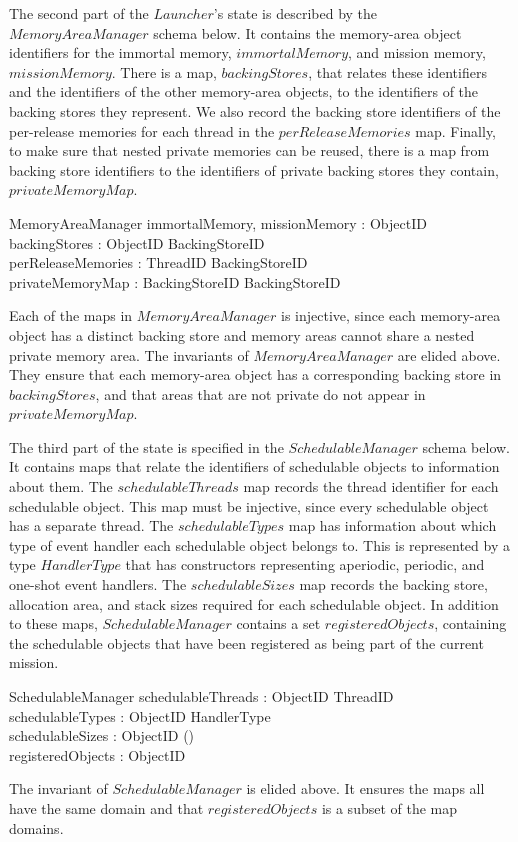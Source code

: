 The second part of the $Launcher$'s state is described by the
$MemoryAreaManager$ schema below.
It contains the memory-area object identifiers for the immortal
memory, $immortalMemory$, and mission memory, $missionMemory$.
There is a map, $backingStores$, that relates these identifiers and
the identifiers of the other memory-area objects, to the identifiers
of the backing stores they represent.
We also record the backing store identifiers of the per-release
memories for each thread in the $perReleaseMemories$ map.
Finally, to make sure that nested private memories can be reused,
there is a map from backing store identifiers to the identifiers of
private backing stores they contain, $privateMemoryMap$.
\begin{schema}{MemoryAreaManager}
  immortalMemory, missionMemory : ObjectID \\
  backingStores : ObjectID \finj BackingStoreID \\
  perReleaseMemories : ThreadID \finj BackingStoreID \\
  privateMemoryMap : BackingStoreID \finj BackingStoreID
\where
  \cdots
\end{schema}
Each of the maps in $MemoryAreaManager$ is injective, since each
memory-area object has a distinct backing store and memory areas
cannot share a nested private memory area.
The invariants of $MemoryAreaManager$ are elided above. 
They ensure that each memory-area object has a corresponding backing
store in $backingStores$, and that areas that are not private do not
appear in $privateMemoryMap$.

The third part of the state is specified in the $SchedulableManager$
schema below.
It contains maps that relate the identifiers of schedulable objects to
information about them.
The $schedulableThreads$ map records the thread identifier for each
schedulable object.
This map must be injective, since every schedulable object has a
separate thread.
The $schedulableTypes$ map has information about which type of
event handler each schedulable object belongs to.
This is represented by a type $HandlerType$ that has constructors
representing aperiodic, periodic, and one-shot event handlers.
The $schedulableSizes$ map records the backing store, allocation area,
and stack sizes required for each schedulable object.
In addition to these maps, $SchedulableManager$ contains a set
$registeredObjects$, containing the schedulable objects that have been
registered as being part of the current mission.
\begin{schema}{SchedulableManager}
  schedulableThreads : ObjectID \finj ThreadID \\
  schedulableTypes : ObjectID \ffun HandlerType \\
  schedulableSizes : ObjectID \ffun (\nat \cross \nat \cross \nat) \\
  registeredObjects : \finset ObjectID
\where
  \cdots
\end{schema}
The invariant of $SchedulableManager$ is elided above.
It ensures the maps all have the same domain and that
$registeredObjects$ is a subset of the map domains.

